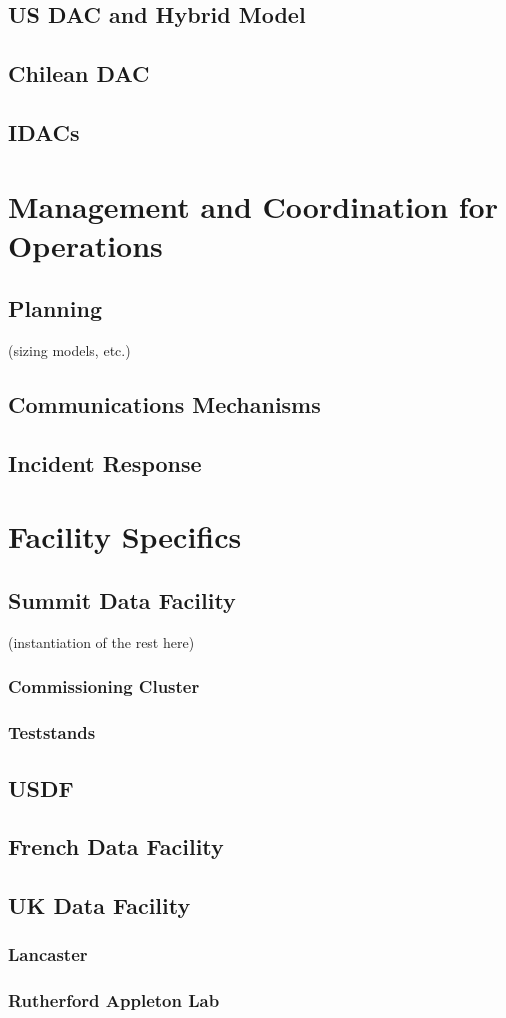 	\subsection{US DAC and Hybrid Model}
	\subsection{Chilean DAC}
	\subsection{IDACs}
\section{Management and Coordination for Operations}
	\subsection{Planning}
	(sizing models, etc.)
	\subsection{Communications Mechanisms}
	\subsection{Incident Response}
\section{Facility Specifics}
	\subsection{Summit Data Facility}
	(instantiation of the rest here)
            \subsubsection{Commissioning Cluster}
            \subsubsection{Teststands}
	\subsection{USDF}
	\subsection{French Data Facility}
	\subsection{UK Data Facility}
	    \subsubsection{Lancaster}
	    \subsubsection{Rutherford Appleton Lab}

\clearpage
